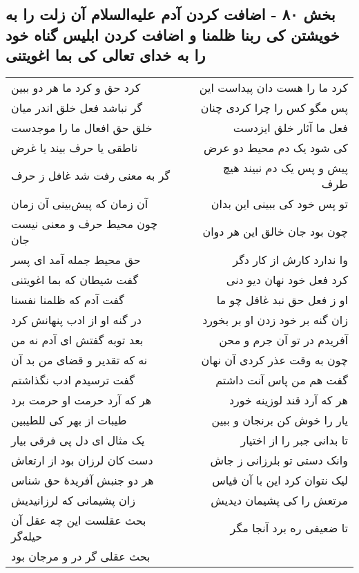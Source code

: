 \begin{center}
\section*{بخش ۸۰ - اضافت کردن آدم علیه‌السلام آن زلت را به خویشتن کی ربنا ظلمنا و اضافت کردن ابلیس گناه خود را به خدای تعالی کی بما اغویتنی}
\label{sec:sh080}
\begin{longtable}{l p{0.5cm} r}
کرد حق و کرد ما هر دو ببین
&&
کرد ما را هست دان پیداست این
\\
گر نباشد فعل خلق اندر میان
&&
پس مگو کس را چرا کردی چنان
\\
خلق حق افعال ما را موجدست
&&
فعل ما آثار خلق ایزدست
\\
ناطقی یا حرف بیند یا غرض
&&
کی شود یک دم محیط دو عرض
\\
گر به معنی رفت شد غافل ز حرف
&&
پیش و پس یک دم نبیند هیچ طرف
\\
آن زمان که پیش‌بینی آن زمان
&&
تو پس خود کی ببینی این بدان
\\
چون محیط حرف و معنی نیست جان
&&
چون بود جان خالق این هر دوان
\\
حق محیط جمله آمد ای پسر
&&
وا ندارد کارش از کار دگر
\\
گفت شیطان که بما اغویتنی
&&
کرد فعل خود نهان دیو دنی
\\
گفت آدم که ظلمنا نفسنا
&&
او ز فعل حق نبد غافل چو ما
\\
در گنه او از ادب پنهانش کرد
&&
زان گنه بر خود زدن او بر بخورد
\\
بعد توبه گفتش ای آدم نه من
&&
آفریدم در تو آن جرم و محن
\\
نه که تقدیر و قضای من بد آن
&&
چون به وقت عذر کردی آن نهان
\\
گفت ترسیدم ادب نگذاشتم
&&
گفت هم من پاس آنت داشتم
\\
هر که آرد حرمت او حرمت برد
&&
هر که آرد قند لوزینه خورد
\\
طیبات از بهر کی للطیبین
&&
یار را خوش کن برنجان و ببین
\\
یک مثال ای دل پی فرقی بیار
&&
تا بدانی جبر را از اختیار
\\
دست کان لرزان بود از ارتعاش
&&
وانک دستی تو بلرزانی ز جاش
\\
هر دو جنبش آفریدهٔ حق شناس
&&
لیک نتوان کرد این با آن قیاس
\\
زان پشیمانی که لرزانیدیش
&&
مرتعش را کی پشیمان دیدیش
\\
بحث عقلست این چه عقل آن حیله‌گر
&&
تا ضعیفی ره برد آنجا مگر
\\
بحث عقلی گر در و مرجان بود

\end{longtable}
\end{center}
